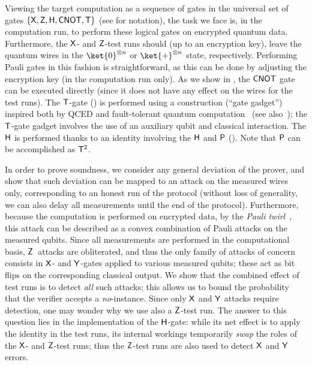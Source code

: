 \documentclass{toc}
\newcommand{\hgate}{{\sf H}}
\newcommand{\pgate}{{\sf P}}
\newcommand{\rgate}{{\sf T}}
\newcommand{\xgate}{{\sf X}}
\newcommand{\ygate}{{\sf Y}}
\newcommand{\zgate}{{\sf Z}}
\newcommand{\cnot}{{\sf CNOT}}
\begin{document}
Viewing the target computation as a sequence of gates in the universal
set of gates
%
%
$\{\xgate, \zgate, \hgate, \cnot, \rgate\}$ (see  for notation), the task we face is, in the computation run, to perform these logical gates on encrypted quantum data. Furthermore, the $\xgate$- and $\zgate$-test runs should (up to an encryption key), leave the quantum wires in the $\ket{0}^{\otimes n}$ or $\ket{+}^{\otimes n}$ state, respectively.
Performing Pauli gates in this fashion is straightforward, as this can be done by adjusting the encryption key (in the computation run only). As we show in , the  $\cnot$ gate can be executed directly (since it does not have any effect on the wires for the test runs). The  $\rgate$-gate () is performed using a construction (``gate gadget'') inspired both by QCED and fault-tolerant quantum computation~\cite{BMP+00} (see also~\cite{BJ15}); the $\rgate$-gate gadget involves the use of an auxiliary qubit and  classical interaction. The $\hgate$ is performed thanks to an identity involving the $\hgate$ and $\pgate$ (). Note that $\pgate$ can be accomplished as $\rgate^2$.


In order to prove soundness, we consider any general deviation of the prover, and show that such deviation can be mapped to an attack on the measured wires only, corresponding to an honest run of the protocol (without loss of generality, we can also delay all measurements until the end of the protocol).
Furthermore, because the computation is performed on encrypted data, by the \emph{Pauli twirl}~\cite{DCEL09}, this attack can be described as a convex combination of Pauli attacks on the measured qubits. Since all measurements are performed in the computational basis, $\zgate$~attacks are obliterated, and thus the only family of attacks of concern consists in  $\xgate$- and $\ygate$-gates applied to various measured qubits; these act as bit flips on the corresponding classical output. We show that the combined effect of test runs is to detect \emph{all} such attacks; this allows us to bound the probability that the verifier accepts a \emph{no}-instance. Since only $\xgate$ and $\ygate$ attacks require detection, one may wonder why we use also a $\zgate$-test run. The answer to this question lies in the implementation of the $\hgate$-gate: while its net effect is to apply the identity in the test runs,
its  internal workings  %
%
%
%
temporarily \emph{swap}
the roles of the $\xgate$- and $\zgate$-test
runs; %
thus the $\zgate$-test runs are also %
%
%
used to detect $\xgate$ and $\ygate$ errors.
\end{document}
